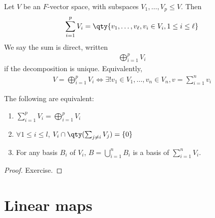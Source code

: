     \begin{definition}
        Let $V$ be an $F$-vector space, with subspaces $V_1, \dots, V_p \leq V$.
        Then
        \begin{align*}
            \sum_{i=1}^p V_i = \qty{ v_1, \dots, v_\ell, v_i \in V_i, 1 \leq i \leq \ell}
        \end{align*}
        We say the sum is direct, written
        \begin{align*}
            \bigoplus_{i=1}^p V_i
        \end{align*}
        if the decomposition is unique.
        Equivalently,
        \begin{align*}
            V = \bigoplus_{i=1}^p V_i \iff \exists!
            v_1 \in V_1, \dots, v_n \in V_n, v = \sum_{i=1}^n v_i
        \end{align*}
    \end{definition}
    \begin{lemma}
        The following are equivalent:
        \begin{enumerate}
            \item $\sum_{i=1}^p V_i = \bigoplus_{i=1}^p V_i$
            \item $\forall 1 \leq i \leq l$, $V_i \cap \qty( \sum_{j \neq i} V_j ) = \{0\}$
            \item For any basis $B_i$ of $V_i$, $B = \bigcup_{i=1}^n B_i$ is a basis of $\sum_{i=1}^n V_i$.
        \end{enumerate}
    \end{lemma}
    \begin{proof}
        Exercise.
    \end{proof}

    \section{Linear maps}
